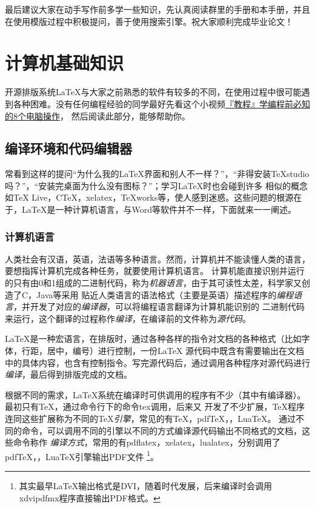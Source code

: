 最后建议大家在动手写作前多学一些知识，先认真阅读群里的手册和本手册，并且在使用模版过程中积极提问，善于使用搜索引擎。祝大家顺利完成毕业论文！
\newpage
\section{计算机基础知识}


开源排版系统\LaTeX{}与大家之前熟悉的软件有较多的不同，在使用过程中很可能遇到各种困难。没有任何编程经验的同学最好先看这个小视频\href{https://www.bilibili.com/video/BV1t4411v78E?from=search&seid=5662014810176309518&spm_id_from=333.337.0.0}{『教程』学编程前必知的8个电脑操作}，
然后阅读此部分，能够帮助你。


\subsection{编译环境和代码编辑器}\label{sub:by}
常看到这样的提问“为什么我的\LaTeX{}界面和别人不一样？”，“非得安装TeXstudio吗？”，“安装完桌面为什么没有图标？”；学习LaTeX时也会碰到许多
相似的概念如\TeX{} Live，C\TeX{}，xelatex，TeXworks等，使人感到迷惑。这些问题的根源在于，\LaTeX{}是一种计算机语言，与Word等软件并不一样，下面就来一一阐述。



\subsubsection{计算机语言}

人类社会有汉语，英语，法语等多种语言。然而，计算机并不能读懂人类的语言，要想指挥计算机完成各种任务，就要使用计算机语言。
计算机能直接识别并运行的只有由0和1组成的二进制代码，称为\emph{机器语言}，由于其可读性太差，科学家又创造了C，Java等采用
贴近人类语言的语法格式（主要是英语）描述程序的\emph{编程语言}，并开发了对应的\emph{编译器}，可以将编程语言翻译为计算机能识别的
二进制代码来运行，这个翻译的过程称作\emph{编译}，在编译前的文件称为\emph{源代码}。

\LaTeX{}是一种宏语言，在排版时，通过各种各样的指令对文档的各种格式（比如字体，行距，居中，编号）进行控制，一份\LaTeX{}
源代码中既含有需要输出在文档中的具体内容，也含有控制指令。写完源代码后，通过调用各种程序对源代码进行\emph{编译}，最后得到排版完成的文档。

根据不同的需求，\LaTeX{}系统在编译时可供调用的程序有不少（其中有编译器）。最初只有\TeX{}，通过命令行下的命令tex调用，后来又
开发了不少扩展，\TeX{}程序连同这些扩展称为不同的\TeX{}\emph{引擎}，常见的有\TeX{}，pdf\TeX{}，\XeTeX{}，Lua\TeX{}。
通过不同的命令，可以调用不同的引擎以不同的方式编译源代码输出不同格式的文档，这些命令称作
\emph{编译方式}，常用的有pdflatex，xelatex，lualatex，分别调用了pdf\TeX{}，\XeTeX{}，Lua\TeX{}引擎输出PDF文件
\footnote{其实最早\LaTeX{}输出格式是DVI，随着时代发展，后来编译时会调用xdvipdfmx程序直接输出PDF格式。}。


